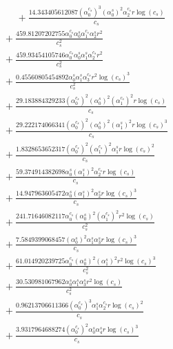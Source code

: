 \documentclass[10pt]{article}
\begin{document}
\begin{align*}
\phantom{R_{3,9}} &\phantom{={}}{}  + \frac{14.343405612087 \left(\alpha_{0}^{c_s}\right)^{3} \left(\alpha_{0}^s\right)^{2} \alpha_{2}^{c_s} r \log{\left(c_{s} \right)}}{c_{s}} \\
&{}  + \frac{459.81207202755 \alpha_{0}^{c_s} \alpha_{0}^s \alpha_{1}^{c_s} \alpha_{2}^s r^{2}}{c_{s}^{2}} \\
&{}  + \frac{459.93454105746 \alpha_{0}^{c_s} \alpha_{0}^s \alpha_{1}^s \alpha_{2}^{c_s} r^{2}}{c_{s}^{2}} \\
&{}  + \frac{0.45560805454892 \alpha_{0}^s \alpha_{1}^s \alpha_{3}^{c_s} r^{2} \log{\left(c_{s} \right)}^{3}}{c_{s}^{2}} \\
&{}  + \frac{29.183884329233 \left(\alpha_{0}^{c_s}\right)^{2} \left(\alpha_{0}^s\right)^{2} \left(\alpha_{1}^{c_s}\right)^{2} r \log{\left(c_{s} \right)}}{c_{s}} \\
&{}  + \frac{29.222174066341 \left(\alpha_{0}^{c_s}\right)^{2} \left(\alpha_{0}^s\right)^{2} \left(\alpha_{1}^s\right)^{2} r \log{\left(c_{s} \right)}^{3}}{c_{s}} \\
&{}  + \frac{1.8328653652317 \left(\alpha_{0}^{c_s}\right)^{2} \left(\alpha_{1}^{c_s}\right)^{2} \alpha_{1}^s r \log{\left(c_{s} \right)}^{2}}{c_{s}} \\
&{}  + \frac{59.374914382698 \alpha_{0}^s \left(\alpha_{1}^s\right)^{2} \alpha_{2}^{c_s} r \log{\left(c_{s} \right)}}{c_{s}} \\
&{}  + \frac{14.947963605472 \alpha_{0}^s \left(\alpha_{1}^s\right)^{2} \alpha_{2}^s r \log{\left(c_{s} \right)}^{3}}{c_{s}} \\
&{}  + \frac{241.71646082117 \alpha_{0}^{c_s} \left(\alpha_{0}^s\right)^{2} \left(\alpha_{1}^{c_s}\right)^{2} r^{2} \log{\left(c_{s} \right)}}{c_{s}^{2}} \\
&{}  + \frac{7.5849399068457 \left(\alpha_{0}^s\right)^{2} \alpha_{1}^s \alpha_{3}^s r \log{\left(c_{s} \right)}^{3}}{c_{s}} \\
&{}  + \frac{61.014920239725 \alpha_{0}^{c_s} \left(\alpha_{0}^s\right)^{2} \left(\alpha_{1}^s\right)^{2} r^{2} \log{\left(c_{s} \right)}^{3}}{c_{s}^{2}} \\
&{}  + \frac{30.530981067962 \alpha_{0}^s \alpha_{1}^s \alpha_{3}^s r^{2} \log{\left(c_{s} \right)}}{c_{s}^{2}} \\
&{}  + \frac{0.96213706611366 \left(\alpha_{0}^{c_s}\right)^{3} \alpha_{1}^s \alpha_{2}^{c_s} r \log{\left(c_{s} \right)}^{2}}{c_{s}} \\
&{}  + \frac{3.9317964688274 \left(\alpha_{0}^{c_s}\right)^{2} \alpha_{0}^s \alpha_{4}^s r \log{\left(c_{s} \right)}^{3}}{c_{s}} \\

\end{align*}
\end{document}
